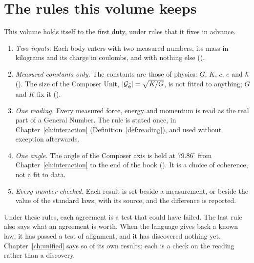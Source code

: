 \section{The rules this volume keeps}\label{sec:al-rules}

This volume holds itself to the first duty, under rules that it fixes in advance.
\begin{enumerate}
  \item \emph{Two inputs.} Each body enters with two measured numbers, its mass in kilograms and its charge in coulombs, and with nothing else ().
  \item \emph{Measured constants only.} The constants are those of physics: $G$, $K$, $c$, $e$ and $\hbar$ (). The size of the Composer Unit, $|\mathcal{G}_{\bar{\phi}}| = \sqrt{K/G}$, is not fitted to anything; $G$ and $K$ fix it ().
  \item \emph{One reading.} Every measured force, energy and momentum is read as the real part of a General Number. The rule is stated once, in Chapter~\ref{ch:interaction} (Definition~\ref{def:reading}), and used without exception afterwards.
  \item \emph{One angle.} The angle of the Composer axis is held at $79.86^\circ$ from Chapter~\ref{ch:interaction} to the end of the book (). It is a choice of coherence, not a fit to data.
  \item \emph{Every number checked.} Each result is set beside a measurement, or beside the value of the standard laws, with its source, and the difference is reported.
\end{enumerate}
Under these rules, each agreement is a test that could have failed. The last rule also says what an agreement is worth. When the language gives back a known law, it has passed a test of alignment, and it has discovered nothing yet. Chapter~\ref{ch:unified} says so of its own results: each is a check on the reading rather than a discovery.

